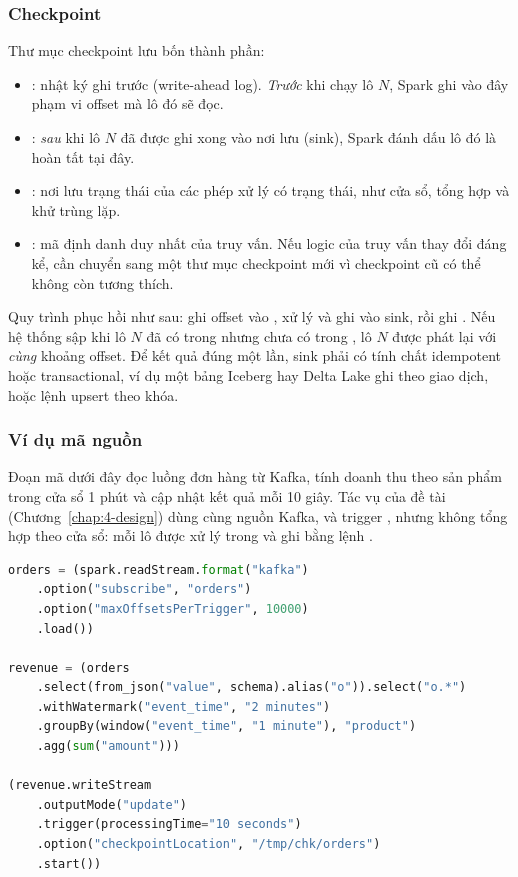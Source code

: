 \subsubsection{Checkpoint}
\label{sec:2-checkpoint}

Thư mục checkpoint lưu bốn thành phần:
\begin{itemize}
  \item {}: nhật ký ghi trước (write-ahead log). \emph{Trước} khi chạy lô $N$, Spark ghi vào đây phạm vi offset mà lô đó sẽ đọc.
  \item {}: \emph{sau} khi lô $N$ đã được ghi xong vào nơi lưu (sink), Spark đánh dấu lô đó là hoàn tất tại đây.
  \item {}: nơi lưu trạng thái của các phép xử lý có trạng thái, như cửa sổ, tổng hợp và khử trùng lặp.
  \item {}: mã định danh duy nhất của truy vấn. Nếu logic của truy vấn thay đổi đáng kể, cần chuyển sang một thư mục checkpoint mới vì checkpoint cũ có thể không còn tương thích.
\end{itemize}

Quy trình phục hồi như sau: ghi offset vào , xử lý và ghi vào sink, rồi ghi . Nếu hệ thống sập khi lô $N$ đã có trong  nhưng chưa có trong , lô $N$ được phát lại với \emph{cùng} khoảng offset. Để kết quả đúng một lần, sink phải có tính chất idempotent hoặc transactional, ví dụ một bảng Iceberg hay Delta Lake ghi theo giao dịch, hoặc lệnh upsert theo khóa.

\subsubsection{Ví dụ mã nguồn}
\label{sec:2-code}

Đoạn mã dưới đây đọc luồng đơn hàng từ Kafka, tính doanh thu theo sản phẩm trong cửa sổ 1 phút và cập nhật kết quả mỗi 10 giây. Tác vụ của đề tài (Chương~\ref{chap:4-design}) dùng cùng nguồn Kafka,  và trigger , nhưng không tổng hợp theo cửa sổ: mỗi lô được xử lý trong  và ghi bằng lệnh .

\begin{lstlisting}[language=Python, caption={Kafka $\rightarrow$ Spark $\rightarrow$ sink với trigger 10 giây}, label={lst:2-example}]
orders = (spark.readStream.format("kafka")
    .option("subscribe", "orders")
    .option("maxOffsetsPerTrigger", 10000)
    .load())

revenue = (orders
    .select(from_json("value", schema).alias("o")).select("o.*")
    .withWatermark("event_time", "2 minutes")
    .groupBy(window("event_time", "1 minute"), "product")
    .agg(sum("amount")))

(revenue.writeStream
    .outputMode("update")
    .trigger(processingTime="10 seconds")
    .option("checkpointLocation", "/tmp/chk/orders")
    .start())
\end{lstlisting}
